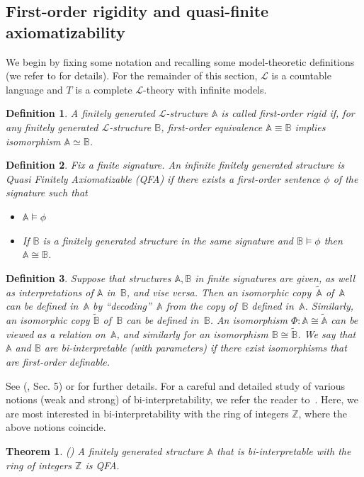 \documentclass{article}
\newtheorem{theorem}{Theorem}[section]
\newtheorem{definition}{Definition}[section]
\theoremstyle{remark}
\def\Z{{\mathbb{Z}}}
\def\MA{{\mathbb{A}}}
\def\MB{{\mathbb{B}}}
\begin{document}
\subsection{First-order rigidity and quasi-finite axiomatizability}
We begin by fixing some notation and recalling some model-theoretic definitions (we refer to \cite{hodges} for details). For the remainder of this section, $\mathcal{L}$ is a countable language and $T$ is a complete $\mathcal{L}$-theory with infinite models.
\begin{definition}
A finitely generated $\mathcal{L}$-structure $\MA$ is called \emph{first-order rigid} if, for any finitely generated $\mathcal{L}$-structure $\MB$, first-order equivalence $\MA \equiv \MB$ implies isomorphism $\MA \simeq \MB$.
\end{definition}




\begin{definition}	Fix a finite signature. An infinite finitely generated  structure is Quasi Finitely Axiomatizable (QFA) if there exists a first-order sentence $\phi$ of the signature such that 
	\begin{itemize}
		\item $\MA\models \phi$
		\item If $\MB$ is a finitely generated structure in the same signature and $\MB\models \phi$ then $\MA\cong \MB$.
\end{itemize} \end{definition}

\begin{definition}
Suppose that structures $\mathbb A, \mathbb B$ in finite signatures are given, as well as
interpretations of $\mathbb A$ in~$\mathbb B$, and vise versa. Then an isomorphic copy~$\widetilde{\mathbb A}$ of~$\mathbb A$ can be defined in~$\mathbb A$ by ``decoding''~$\mathbb A$ from the copy of~$\mathbb B$ defined in~$\mathbb A$.
Similarly, an isomorphic copy $\widetilde{\mathbb B}$ of~$\mathbb B$ can be defined in~$\mathbb B$. An isomorphism $\Phi: {\mathbb A}\cong \widetilde{\mathbb A}$ can be viewed as a relation on~$\mathbb A$, and similarly for an isomorphism $\mathbb B \cong \widetilde{\mathbb B}$.
We say that $\mathbb A$ and $\mathbb B$ are \emph{bi-interpretable} (with parameters) if there
 exist isomorphisms that are first-order definable. \end{definition}
 
See (\cite{Nies2007}, Sec. 5) or \cite{Rich} for further details. For a careful and detailed study of various notions (weak and strong) of bi-interpretability, we refer the reader to~\cite{AKNS}. Here, we are most interested in bi-interpretability with the ring of integers $\Z$, where the above notions coincide.
\begin{theorem}(\cite{Nies2007}) A finitely generated structure $\mathbb A$ that is bi-interpretable with the ring of integers $\Z$ is QFA.\end{theorem}
\end{document}
